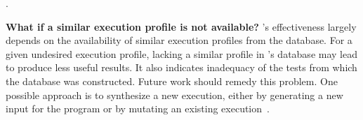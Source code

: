 .




\vspace{1mm}
\noindent \textbf{What if a similar execution profile is not available?}
\ourtool's effectiveness largely depends on the availability of
similar execution profiles from the database. For a given undesired execution profile, lacking a similar
profile in \ourtool's database may lead \ourtool to produce
less useful results.  It also indicates inadequacy of the tests from
which the database was constructed.
Future work should remedy this problem. One
possible approach is to synthesize a new execution, either by
generating a new input for the program or by mutating an
existing execution~\cite{sumnerICSE2011}.





